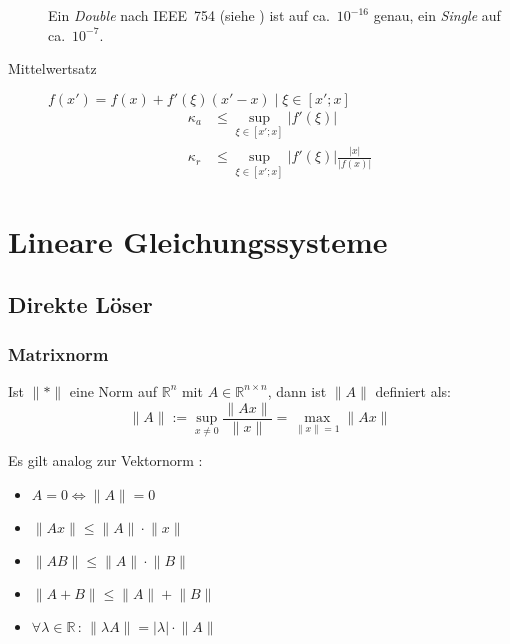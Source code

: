 \begin{description}
	Ein \mbox{\emph{Double}} nach IEEE~754 (siehe \pageref{Gleitkommazahlen(IEEE754)}) ist auf ca.~$10^{-16}$ genau, ein \mbox{\emph{Single}} auf ca.~$10^{-7}$.
  \item [{Mittelwertsatz}]
	$f(x')=f(x)+f'(\xi)(x'-x)\mid\xi\in[x';x]$
	\begin{align*}
	  \kappa_{a} & \leq \sup_{\xi\in[x';x]} \lvert f'(\xi) \rvert\\
	  \kappa_{r} & \leq \sup_{\xi\in[x';x]} \lvert f'(\xi) \rvert \frac{\lvert x \rvert}{\lvert f(x) \rvert}
	\end{align*}
\end{description}

\chapter{Lineare Gleichungssysteme}


\section{Direkte Löser}


\subsection{Matrixnorm}

Ist $\lVert * \rVert$ eine Norm auf $\mathbb{R}^{n}$ mit $A\in\mathbb{R}^{n\times n}$, dann ist $\lVert A \rVert$ definiert als:
\[ \lVert A \rVert := \sup_{x\neq0} \frac{\lVert Ax \rVert}{\lVert x \rVert} = \max_{\lVert x \rVert=1} \lVert Ax \rVert \]


Es gilt analog zur Vektornorm :
\begin{itemize}
  \item $A = 0 \Leftrightarrow \lVert A \rVert = 0$
  \item $\lVert Ax \rVert \leq \lVert A \rVert \cdot \lVert x \rVert$
  \item $\lVert AB \rVert \leq \lVert A \rVert \cdot \lVert B \rVert$
  \item $\lVert A+B \rVert \leq \lVert A \rVert + \lVert B \rVert$
  \item $\forall\lambda\in\mathbb{R}\,:\,\lVert \lambda A \rVert = \lvert\lambda\rvert \cdot \lVert A \rVert$
\end{itemize}

